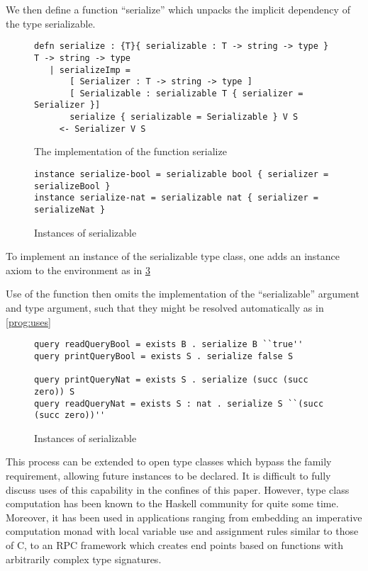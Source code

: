We then define a function ``serialize'' which unpacks the implicit dependency of the type serializable.


\begin{figure}[H]
\begin{lstlisting}
defn serialize : {T}{ serializable : T -> string -> type } T -> string -> type
   | serializeImp = 
       [ Serializer : T -> string -> type ]
       [ Serializable : serializable T { serializer = Serializer }]
       serialize { serializable = Serializable } V S
     <- Serializer V S
\end{lstlisting}
\caption{The implementation of the function serialize }
\label{prog:imp}
\end{figure}


\begin{figure}[H]
\begin{lstlisting}
instance serialize-bool = serializable bool { serializer = serializeBool }
instance serialize-nat = serializable nat { serializer = serializeNat }
\end{lstlisting}
\caption{ Instances of serializable }
\label{prog:inst}
\end{figure}


To implement an instance of the serializable type class, one adds an instance axiom to the environment as in \ref{prog:inst}

Use of the function then omits the implementation of the ``serializable'' argument and type argument, such that they might be resolved automatically as in \ref{prog:uses}


\begin{figure}[H]
\begin{lstlisting}
query readQueryBool = exists B . serialize B ``true''
query printQueryBool = exists S . serialize false S

query printQueryNat = exists S . serialize (succ (succ zero)) S
query readQueryNat = exists S : nat . serialize S ``(succ (succ zero))''
\end{lstlisting}
\caption{ Instances of serializable }
\label{prog:inst}
\end{figure}


This process can be extended to open type classes which bypass the family requirement, allowing
future instances to be declared.
It is difficult to fully discuss uses of this capability in the confines of this paper. However,
type class computation has been known to the Haskell community for quite some time. Moreover, it 
has been used in applications ranging from embedding an imperative computation monad with local variable use and 
assignment rules similar to those of C, to an RPC framework which creates end points based on functions with arbitrarily complex type signatures.
